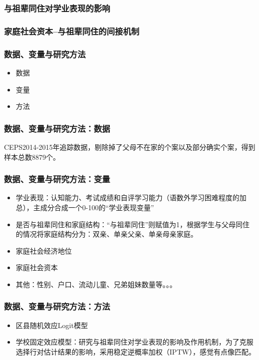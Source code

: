 \documentclass{beamer}
\begin{document}
\begin{frame}
	\frametitle{与祖辈同住对学业表现的影响}

\end{frame}


\begin{frame}
	\frametitle{家庭社会资本--与祖辈同住的间接机制}
\end{frame}

\begin{frame}
	\frametitle{数据、变量与研究方法}
	\begin{itemize}
		\item 数据
		\item 变量
		\item 方法
	\end{itemize}
\end{frame}

\begin{frame}
	\frametitle{数据、变量与研究方法：数据}
	CEPS2014-2015年追踪数据，剔除掉了父母不在家的个案以及部分确实个案，得到样本总数8879个。
\end{frame}


\begin{frame}
	\frametitle{数据、变量与研究方法：变量}
	\begin{itemize}
		\item 学业表现：认知能力、考试成绩和自评学习能力（语数外学习困难程度的加总），主成分合成一个0-100的“学业表现变量”
		\item 是否与祖辈同住和家庭结构：“与祖辈同住”则赋值为1，根据学生与父母同住的情况将家庭结构分为：双亲、单亲父亲、单亲母亲家庭。
		\item 家庭社会经济地位
		\item 家庭社会资本
		\item 其他：性别、户口、流动儿童、兄弟姐妹数量等。。。
	\end{itemize}
\end{frame}

\begin{frame}
	\frametitle{数据、变量与研究方法：方法}
	\begin{itemize}
		\item 区县随机效应Logit模型
		\item 学校固定效应模型：研究与祖辈同住对学业表现的影响及作用机制，为了克服选择行对估计结果的影响，采用稳定逆概率加权（IPTW），感觉有点像匹配。
	\end{itemize}
\end{frame}
\end{document}
